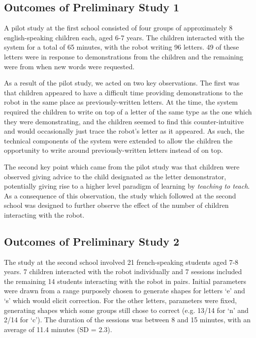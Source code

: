 \documentclass{sig-alternate}
\begin{document}
\subsection{Outcomes of Preliminary Study 1}


A pilot study at the first school consisted of four groups of approximately 8
english-speaking children each, aged 6-7 years. The children interacted with the
system for a total of 65 minutes, with the robot writing 96 letters. 49 of these
letters were in response to demonstrations from the children and the remaining
were from when new words were requested. 

As a result of the pilot study, we acted on two key observations. The first was
that children appeared to have a difficult time providing demonstrations to the
robot in the same place as previously-written letters. At the time, the system
required the children to write on top of a letter of the same type as the one
which they were demonstrating, and the children seemed to find this
counter-intuitive and would occasionally just trace the robot's letter as it
appeared. As such, the technical components of the system were extended to allow
the children the opportunity to write around previously-written letters instead
of on top. 

The second key point which came from the pilot study was that children were
observed giving advice to the child designated as the letter demonstrator,
potentially giving rise to a higher level paradigm of learning by \emph{teaching
to teach}. As a consequence of this observation, the study which followed at the
second school was designed to further observe the effect of the number of
children interacting with the robot.

\subsection{Outcomes of Preliminary Study 2}

The study at the second school involved 21 french-speaking students aged 7-8
years. 7 children interacted with the robot individually and 7 sessions included
the remaining 14 students interacting with the robot in pairs.  Initial
parameters were drawn from a range purposely chosen to generate shapes for
letters `e' and `s' which would elicit correction. For the other letters,
parameters were fixed, generating shapes which some groups still chose to
correct (e.g. 13/14 for `n' and 2/14 for `c'). The duration of the sessions was
between 8 and 15 minutes, with an average of 11.4 minutes (SD = 2.3). 
\end{document}
